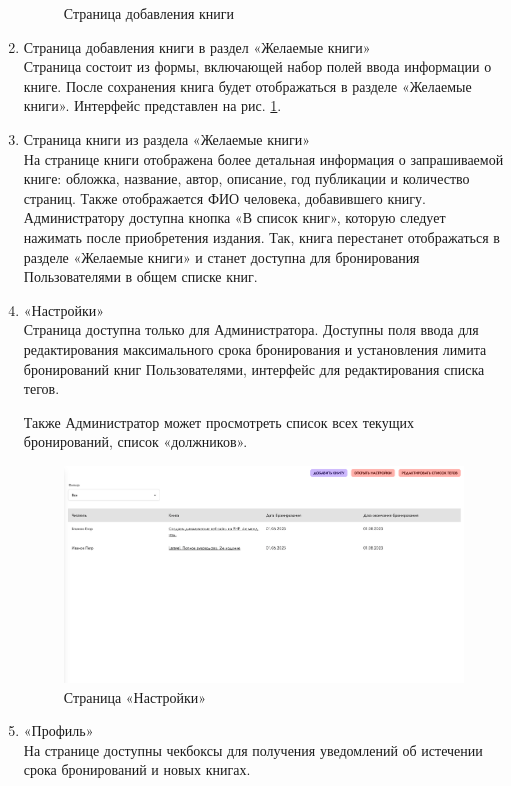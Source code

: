 \documentclass[project.tex]{subfiles}
\begin{document}
\begin{enumerate}
\begin{figure}[H]
       \caption{Страница добавления книги} 
       \label{pic:form}
    \end{figure}
    \item Страница добавления книги в раздел «Желаемые книги»\\
    Страница состоит из формы, включающей набор полей ввода информации о книге. После сохранения книга будет отображаться в разделе «Желаемые книги». Интерфейс представлен на рис. \ref{pic:form}.
    \item Страница книги из раздела «Желаемые книги»\\
    На странице книги отображена более детальная информация о запрашиваемой книге: обложка, название, автор, описание, год публикации и количество страниц. Также отображается ФИО человека, добавившего книгу. Администратору доступна кнопка «В список книг», которую следует нажимать после приобретения издания. Так, книга перестанет отображаться в разделе «Желаемые книги» и станет доступна для бронирования Пользователями в общем списке книг.
    \item «Настройки»\\
    Страница доступна только для Администратора. Доступны поля ввода для редактирования максимального срока бронирования и установления лимита бронирований книг Пользователями, интерфейс для редактирования списка тегов.
    \par
    Также Администратор может просмотреть список всех текущих бронирований, список «должников».
    \begin{figure}[H]
       \includegraphics[width=\textwidth, frame]{../../graphics/settings.png}
       \caption{Страница «Настройки»} 
       \label{pic:settings}
    \end{figure}
    \item «Профиль»\\
    На странице доступны чекбоксы для получения уведомлений об истечении срока бронирований и новых книгах.
\end{enumerate}
\end{document}
